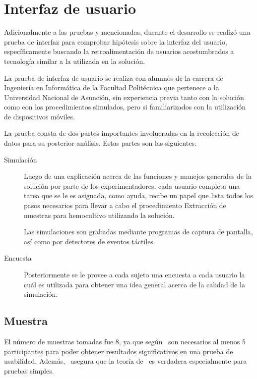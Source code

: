 \section{Interfaz de usuario}
\label{sec:interfaz}

Adicionalmente a las pruebas y mencionadas, durante el desarrollo se realizó una
prueba de interfaz para comprobar hipótesis sobre la interfaz del usuario,
específicamente buscando la retroalimentación de usuarios acostumbrados a
tecnología similar a la utilizada en la solución.

La prueba de interfaz de usuario se realiza con alumnos de la carrera de
Ingeniería en Informática de la Facultad Politécnica que pertenece a la
Universidad Nacional de Asunción, sin experiencia
previa tanto con la solución como con los procedimientos simulados, pero si
familiarizados con la utilización de dispositivos móviles.

La prueba consta de dos partes importantes involucradas en la recolección
de datos para su posterior análisis. Estas partes son las siguientes:

\begin{description}

\item[Simulación] Luego de una explicación acerca de las funciones y manejos
    generales de la solución por parte de los experimentadores, cada usuario
    completa una tarea que se le es asignada, como ayuda, recibe un papel que
    lista todos los pasos necesarios para llevar a cabo el procedimiento
    Extracción de muestras para hemocultivo utilizando la solución.
    	
    Las simulaciones son grabadas mediante programas de captura de pantalla, así
    como por detectores de eventos táctiles.
    	
\item[Encuesta] Posteriormente se le provee a cada sujeto una encuesta a cada
    usuario la cuál es utilizada para obtener una idea general acerca de la
    calidad de la simulación. 

\end{description} 

\subsection{Muestra}

El número de muestras tomadas fue 8, ya que según~\cite{nielsen2000} son necesarios
al menos 5 participantes para poder obtener resultados significativos en una prueba
de usabilidad. Además,~\cite{ritch2009} asegura que la teoría de~\cite{nielsen2000}
es verdadera especialmente para pruebas simples. 

